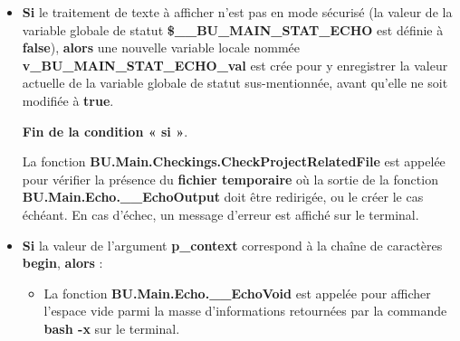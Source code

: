 \documentclass[a4paper,10pt]{article}
\begin{document}
    \begin{itemize}
        \item
        {
            \begin{justify}
                \textbf{\color{cond}Si} le traitement de texte à afficher n'est pas en mode sécurisé (la valeur de la variable globale de statut \textbf{\color{vars}\$\_\_BU\_MAIN\_STAT\_ECHO} est définie à \textbf{false}), \textbf{\color{cond}alors} une nouvelle variable locale nommée \textbf{\color{vars}v\_BU\_MAIN\_STAT\_ECHO\_val} est crée pour y enregistrer la valeur actuelle de la variable globale de statut sus-mentionnée, avant qu'elle ne soit modifiée à \textbf{true}.
            \end{justify}

            \setlength{\parskip}{1em}

            \begin{justify}
                \textbf{\color{cond}Fin de la condition « si »}.
            \end{justify}
        }

        \begin{justify}\setlength{\parskip}{2em}
            La fonction \textbf{\color{func}BU.Main.Checkings.CheckProjectRelatedFile} est appelée pour vérifier la présence du \textbf{\color{path}fichier temporaire} où la sortie de la fonction \textbf{\color{func}BU.Main.Echo.\_\_EchoOutput} doit être redirigée, ou le créer le cas échéant. En cas d'échec, un message d'erreur est affiché sur le terminal.
        \end{justify}

        \item
        {
            \setlength{\parskip}{2em}

            \begin{justify}
                \textbf{\color{cond}Si} la valeur de l'argument \textbf{\color{vars}p\_context} correspond à la chaîne de caractères \textbf{begin}, \textbf{\color{cond}alors} :
            \end{justify}

            \setlength{\parskip}{1em}

            \begin{itemize}
                \item
                {
                    \begin{justify}
                        La fonction \textbf{\color{func}BU.Main.Echo.\_\_EchoVoid} est appelée pour afficher l'espace vide parmi la masse d'informations retournées par la commande \textbf{\color{cmds}bash -x} sur le terminal.
                    \end{justify}
                }


\end{itemize}}
\end{itemize}
\end{document}

